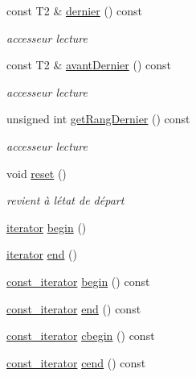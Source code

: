 \begin{DoxyCompactItemize}
const T2 \& \hyperlink{class_simulateur_a90dded0212c5d4f7005b90290f30c81a}{dernier} () const 
\begin{DoxyCompactList}\small\item\em accesseur lecture \end{DoxyCompactList}\item 
const T2 \& \hyperlink{class_simulateur_aca4b266c11eb65f61c0cb958d4232c0f}{avant\+Dernier} () const 
\begin{DoxyCompactList}\small\item\em accesseur lecture \end{DoxyCompactList}\item 
unsigned int \hyperlink{class_simulateur_afc98cbe3954590d6185b8c7c5d9fddd4}{get\+Rang\+Dernier} () const 
\begin{DoxyCompactList}\small\item\em accesseur lecture \end{DoxyCompactList}\item 
void \hyperlink{class_simulateur_a13ab6b17b05b2e70f2677543da4bde29}{reset} ()
\begin{DoxyCompactList}\small\item\em revient à l\textquotesingle{}état de départ \end{DoxyCompactList}\item 
\hyperlink{class_simulateur_1_1iterator}{iterator} \hyperlink{class_simulateur_aed5c2fe918140f59e51b39045263fe95}{begin} ()
\item 
\hyperlink{class_simulateur_1_1iterator}{iterator} \hyperlink{class_simulateur_aa9b6cc97791d4a46672ad5f4c998e6b2}{end} ()
\item 
\hyperlink{class_simulateur_1_1const__iterator}{const\+\_\+iterator} \hyperlink{class_simulateur_a0d59edd64a07747beae2532b1bcf822a}{begin} () const 
\item 
\hyperlink{class_simulateur_1_1const__iterator}{const\+\_\+iterator} \hyperlink{class_simulateur_a1fb0351ecf22dc11327914a1aba67081}{end} () const 
\item 
\hyperlink{class_simulateur_1_1const__iterator}{const\+\_\+iterator} \hyperlink{class_simulateur_a8efcc9d5d6c025fc139c3ad53c6323de}{cbegin} () const 
\item 
\hyperlink{class_simulateur_1_1const__iterator}{const\+\_\+iterator} \hyperlink{class_simulateur_aa69d1c52944b844cb45953ea063e20d2}{cend} () const 
\end{DoxyCompactItemize}
